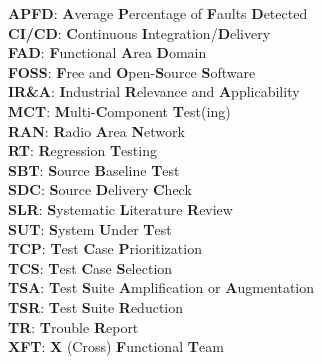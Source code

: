\documentclass[11pt, a4paper, oneside]{Thesis} %
\begin{document}
\clearpage %
{
\textbf{APFD}: \textbf{A}verage \textbf{P}ercentage of \textbf{F}aults \textbf{D}etected\\
\textbf{CI/CD}: \textbf{C}ontinuous \textbf{I}ntegration/\textbf{D}elivery \\
\textbf{FAD}: \textbf{F}unctional \textbf{A}rea \textbf{D}omain \\
\textbf{FOSS}: \textbf{F}ree and \textbf{O}pen-\textbf{S}ource \textbf{S}oftware \\
\textbf{IR\&A}: \textbf{I}ndustrial \textbf{R}elevance and \textbf{A}pplicability \\
\textbf{MCT}: \textbf{M}ulti-\textbf{C}omponent \textbf{T}est(ing) \\
\textbf{RAN}: \textbf{R}adio \textbf{A}rea \textbf{N}etwork \\
\textbf{RT}: \textbf{R}egression \textbf{T}esting \\
\textbf{SBT}: \textbf{S}ource \textbf{B}aseline \textbf{T}est \\
\textbf{SDC}: \textbf{S}ource \textbf{D}elivery \textbf{C}heck \\
\textbf{SLR}: \textbf{S}ystematic \textbf{L}iterature \textbf{R}eview \\
\textbf{SUT}: \textbf{S}ystem \textbf{U}nder \textbf{T}est \\
\textbf{TCP}: \textbf{T}est \textbf{C}ase \textbf{P}rioritization \\
\textbf{TCS}: \textbf{T}est \textbf{C}ase \textbf{S}election \\
\textbf{TSA}: \textbf{T}est \textbf{S}uite \textbf{A}mplification or \textbf{A}ugmentation \\
\textbf{TSR}: \textbf{T}est \textbf{S}uite \textbf{R}eduction \\
\textbf{TR}: \textbf{T}rouble \textbf{R}eport \\
\textbf{XFT}: \textbf{X} (Cross) \textbf{F}unctional \textbf{T}eam \\



}
\end{document}
